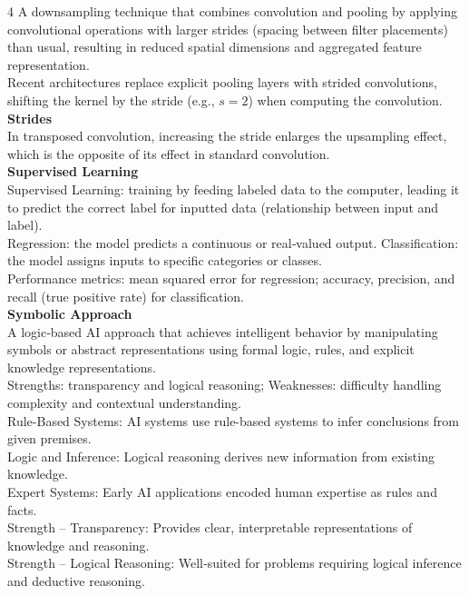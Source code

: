 \documentclass[8pt]{extarticle}
\begin{document}
\begin{multicols}{4}
A downsampling technique that combines convolution and pooling by applying convolutional operations with larger strides (spacing between filter placements) than usual, resulting in reduced spatial dimensions and aggregated feature representation.\\
Recent architectures replace explicit pooling layers with strided convolutions, shifting the kernel by the stride (e.g., $s = 2$) when computing the convolution.\\
\vspace{2pt}\textbf{Strides}\\
In transposed convolution, increasing the stride enlarges the upsampling effect, which is the opposite of its effect in standard convolution.\\
\vspace{2pt}\textbf{Supervised Learning}\\
Supervised Learning: training by feeding labeled data to the computer, leading it to predict the correct label for inputted data (relationship between input and label).\\
Regression: the model predicts a continuous or real‑valued output. Classification: the model assigns inputs to specific categories or classes.\\
Performance metrics: mean squared error for regression; accuracy, precision, and recall (true positive rate) for classification.\\
\vspace{2pt}\textbf{Symbolic Approach}\\
A logic‑based AI approach that achieves intelligent behavior by manipulating symbols or abstract representations using formal logic, rules, and explicit knowledge representations.\\
Strengths: transparency and logical reasoning; Weaknesses: difficulty handling complexity and contextual understanding.\\
Rule-Based Systems: AI systems use rule-based systems to infer conclusions from given premises.\\
Logic and Inference: Logical reasoning derives new information from existing knowledge.\\
Expert Systems: Early AI applications encoded human expertise as rules and facts.\\
Strength – Transparency: Provides clear, interpretable representations of knowledge and reasoning.\\
Strength – Logical Reasoning: Well‑suited for problems requiring logical inference and deductive reasoning.\\

\end{multicols}
\end{document}
